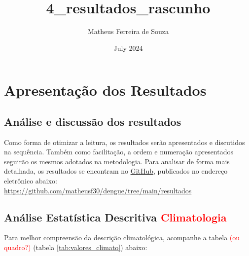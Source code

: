 \documentclass[
	12pt,				%
	openright,			%
	oneside,			%
	a4paper,			%
	english,			%
	french,				%
	spanish,			%
	brazil				%
	dvipsnames, table]{abntex2}
\title{4_resultados_rascunho}
\author{Matheus Ferreira de Souza}
\date{July 2024}
\begin{document}
\maketitle

\newpage

\chapter{Apresentação dos Resultados}

\section{Análise e discussão dos resultados}

\indent Como forma de otimizar a leitura, os resultados serão apresentados e discutidos na sequência. Também como facilitação, a ordem e numeração apresentados seguirão os mesmos adotados na metodologia. Para analisar de forma mais detalhada, os resultados se encontram no \href{https://github.com/matheusf30/dengue/tree/main/resultados}{GitHub}, publicados no endereço eletrônico abaixo:\\
\url{https://github.com/matheusf30/dengue/tree/main/resultados}\\


\section{Análise Estatística Descritiva \textcolor{red}{Climatologia}}

\indent Para melhor compreensão da descrição climatológica, acompanhe a tabela \textcolor{red}{(ou quadro?)} (tabela \ref{tab:valores_climato}) abaixo:
\end{document}
